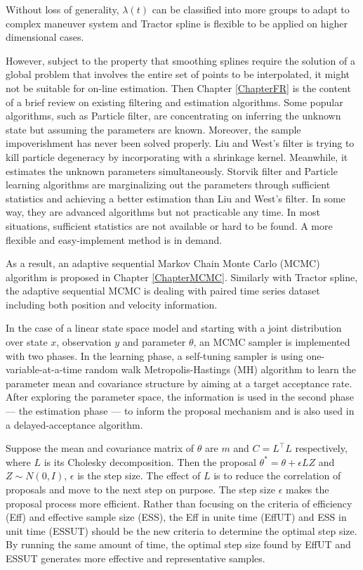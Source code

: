 Without loss of generality, $\lambda(t)$ can be classified into more groups to adapt to complex maneuver system and Tractor spline is flexible to be applied on higher dimensional cases. 


However, subject to the property that smoothing splines require the solution of a global problem that involves the entire set of points to be interpolated, it might not be suitable for on-line estimation. Then Chapter \ref{ChapterFR} is the content of a brief review on existing filtering and estimation algorithms. Some popular algorithms, such as Particle filter, are concentrating on inferring the unknown state but assuming the parameters are known. Moreover, the sample impoverishment has never been solved properly. Liu and West's filter is trying to kill particle degeneracy by incorporating with a shrinkage kernel. Meanwhile, it estimates the unknown parameters simultaneously. Storvik filter and Particle learning algorithms are marginalizing out the parameters through sufficient statistics and achieving a better estimation than Liu and West's filter. In some way, they are advanced algorithms but not practicable any time. In most situations, sufficient statistics are not available or hard to be found. A more flexible and easy-implement method is in demand. 
 

As a result, an adaptive sequential Markov Chain Monte Carlo (MCMC) algorithm is proposed in Chapter \ref{ChapterMCMC}. Similarly with Tractor spline, the adaptive sequential MCMC is dealing with paired time series dataset including both position and velocity information. 


In the case of a linear state space model and starting with a joint distribution over state $x$, observation $y$ and parameter $\theta$, an MCMC sampler is implemented with two phases. In the learning phase, a self-tuning sampler is using one-variable-at-a-time random walk Metropolis-Hastings (MH) algorithm to learn the parameter mean and covariance structure by aiming at a target acceptance rate. After exploring the parameter space, the information is used in the second phase --- the estimation phase --- to inform the proposal mechanism and is also used in a delayed-acceptance algorithm. 


Suppose the mean and covariance matrix of $\theta$ are $m$ and $C=L^\top L$ respectively, where $L$ is its Cholesky decomposition. Then the proposal $\theta^*=\theta + \epsilon LZ$ and $Z\sim N(0,I)$, $\epsilon$ is the step size. The effect of $L$ is to reduce the correlation of proposals and move to the next step on purpose. The step size $\epsilon$ makes the proposal process more efficient. Rather than focusing on the criteria of efficiency (Eff) and effective sample size (ESS), the Eff in unite time (EffUT) and ESS in unit time (ESSUT) should be the new criteria to determine the optimal step size. By running the same amount of time, the optimal step size found by EffUT and ESSUT generates more effective and representative samples. 


